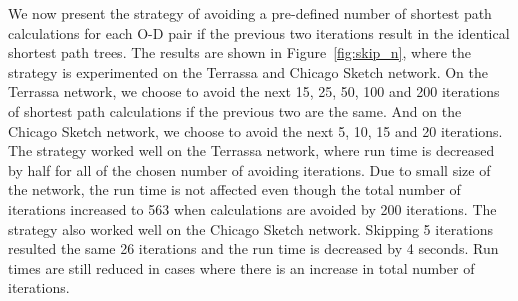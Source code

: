 We now present the strategy of avoiding a pre-defined number of shortest path calculations for each O-D pair if the previous two iterations result in the identical shortest path trees.
The results are shown in Figure~\ref{fig:skip_n},
where the strategy is experimented on the Terrassa and Chicago Sketch network.
On the Terrassa network,
we choose to avoid the next 15, 25, 50, 100 and 200 iterations of shortest path calculations if the previous two are the same.
And on the Chicago Sketch network,
we choose to avoid the next 5, 10, 15 and 20 iterations.
The strategy worked well on the Terrassa network,
where run time is decreased by half for all of the chosen number of avoiding iterations.
Due to small size of the network,
the run time is not affected even though the total number of iterations increased to 563 when calculations are avoided by 200 iterations.
The strategy also worked well on the Chicago Sketch network.
Skipping 5 iterations resulted the same 26 iterations and the run time is decreased by 4 seconds.
Run times are still reduced in cases where there is an increase in total number of iterations.

